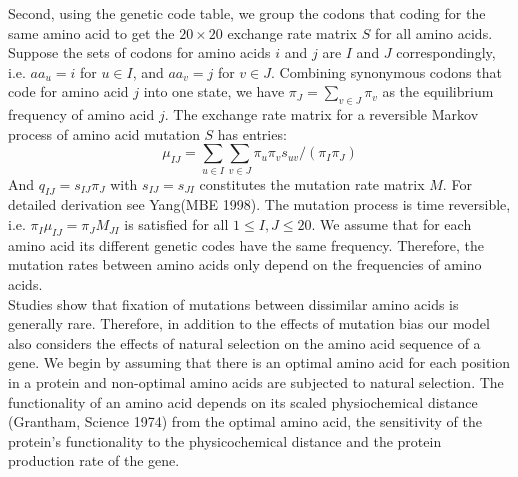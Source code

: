 \documentclass[13pt]{article}
\begin{document}
Second, using the genetic code table, we group the codons that coding for the same amino acid to get the $20 \times 20$ exchange rate matrix $S$ for all amino acids.
Suppose the sets of codons for amino acids $i$ and $j$ are $I$ and $J$ correspondingly, i.e. $aa_u = i$ for $u \in I$, and $aa_v = j$ for $v \in J$.
Combining synonymous codons that code for amino acid $j$ into one state, we have $\pi_J = \sum_{v \in J} \pi_v$ as the equilibrium frequency of amino acid $j$.
The exchange rate matrix for a reversible Markov process of amino acid mutation $S$ has entries:
\[\mu_{IJ} = \sum_{u \in I} \sum_{v \in J} \pi_u \pi_v s_{uv} / (\pi_I \pi_J)\]
\noindent
And $q_{IJ} = s_{IJ} \pi_J$ with $s_{IJ}  = s_{JI}$ constitutes the mutation rate matrix $M$.
For detailed derivation see Yang(MBE 1998).
The mutation process is time reversible, i.e. $\pi_I \mu_{IJ} = \pi_J M_{JI}$ is satisfied for all $1 \leq I,J \leq 20$.
We assume that for each amino acid its different genetic codes have the same frequency.
Therefore, the mutation rates between amino acids only depend on the frequencies of amino acids. \\

Studies show that fixation of mutations between dissimilar amino acids is generally rare.
Therefore, in addition to the effects of mutation bias our model also considers the effects of natural selection on the amino acid sequence of a gene.
We begin by assuming that there is an optimal amino acid for each position in a protein and non-optimal amino acids are subjected to natural selection.
The functionality of an amino acid depends on its scaled physiochemical distance (Grantham, Science 1974) from the optimal amino acid, the sensitivity of the protein's functionality to the physicochemical distance and the protein production rate of the gene. \\
\end{document}
